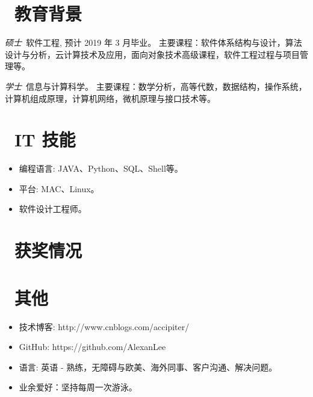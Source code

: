 \documentclass{resume}
\begin{document}
\section{\faGraduationCap\  教育背景}
\textit{硕士}\ 软件工程, 预计 2019 年 3 月毕业。
 主要课程：软件体系结构与设计，算法设计与分析，云计算技术及应用，面向对象技术高级课程，软件工程过程与项目管理等。

\textit{学士}\ 信息与计算科学。
 主要课程：数学分析，高等代数，数据结构，操作系统，计算机组成原理，计算机网络，微机原理与接口技术等。



\section{\faCogs\ IT 技能}
\begin{itemize}[parsep=0.5ex]
  \item 编程语言: JAVA、Python、SQL、Shell等。
  \item 平台: MAC、Linux。
  \item 软件设计工程师。
\end{itemize}

\section{\faHeartO\ 获奖情况}

\section{\faInfo\ 其他}
\begin{itemize}[parsep=0.5ex]
  \item 技术博客: http://www.cnblogs.com/accipiter/
  \item GitHub: https://github.com/AlexanLee
  \item 语言: 英语 - 熟练，无障碍与欧美、海外同事、客户沟通、解决问题。
  \item 业余爱好：坚持每周一次游泳。
\end{itemize}

%
%
\end{document}
